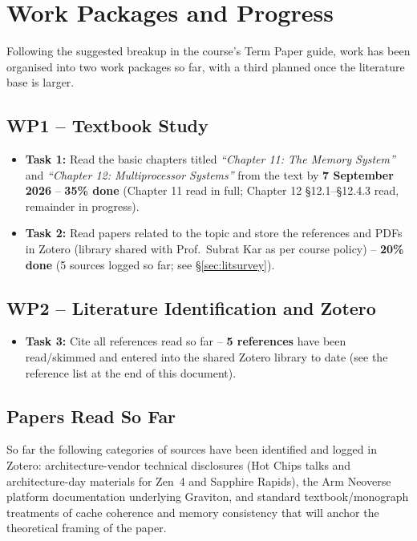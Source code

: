 \documentclass[11pt,a4paper]{article}
\begin{document}
\section{Work Packages and Progress}

Following the suggested breakup in the course's Term Paper guide, work has been organised into
two work packages so far, with a third planned once the literature base is larger.

\subsection{WP1 -- Textbook Study}
\begin{itemize}[nosep]
  \item \textbf{Task 1:} Read the basic chapters titled \emph{``Chapter 11: The Memory
        System''} and \emph{``Chapter 12: Multiprocessor Systems''} from the text by
        \textbf{7 September 2026} -- \textbf{35\% done} (Chapter 11 read in full; Chapter 12
        \S12.1--\S12.4.3 read, remainder in progress).
  \item \textbf{Task 2:} Read papers related to the topic and store the references and PDFs
        in Zotero (library shared with Prof.\ Subrat Kar as per course policy)
        -- \textbf{20\% done} (5 sources logged so far; see \S\ref{sec:litsurvey}).
\end{itemize}

\subsection{WP2 -- Literature Identification and Zotero}
\begin{itemize}[nosep]
  \item \textbf{Task 3:} Cite all references read so far -- \textbf{5 references} have been
        read/skimmed and entered into the shared Zotero library to date (see the reference
        list at the end of this document).
\end{itemize}

\subsection{Papers Read So Far}
So far the following categories of sources have been identified and logged in Zotero:
architecture-vendor technical disclosures (Hot Chips talks and architecture-day materials for
Zen~4 and Sapphire Rapids), the Arm Neoverse platform documentation underlying Graviton,
and standard textbook/monograph treatments of cache coherence and memory consistency that
will anchor the theoretical framing of the paper.
\end{document}
